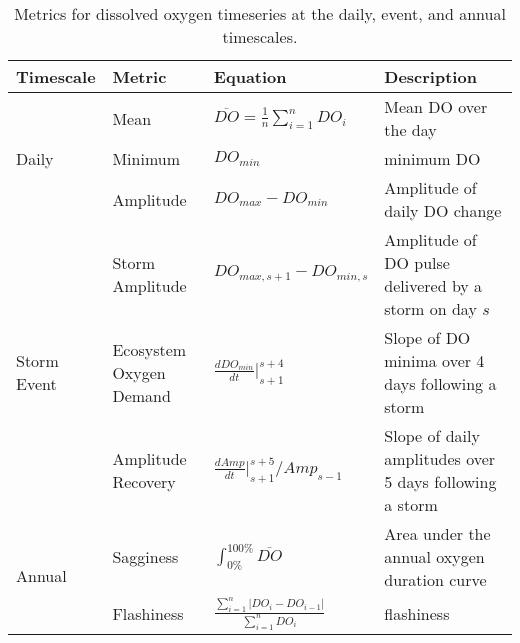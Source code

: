 \documentclass{article}
\begin{document}
\begin{table}[h!]
  \begin{center}
    \caption{Metrics for dissolved oxygen timeseries at the daily, event, and annual timescales.}
    \label{tab:table1}
    \begin{tabular}{p{.8in}|p{1in}|p{1.5in}|p{2in}} 
      \textbf{Timescale} & \textbf{Metric} & \textbf{Equation} & \textbf{Description}\\
      \hline
	\multirow{3}{*}{Daily} & Mean & $\overline{DO}=\frac{1}{n}\sum_{i=1}^{n} DO_{i}$ & Mean DO over the day\\ 
      & Minimum & $DO_{min}$ & minimum DO\\
	& Amplitude & $DO_{max}-DO_{min}$ & Amplitude of daily DO change\\
	\hline
      \multirow {3}{*}{Storm Event} & Storm \newline Amplitude & $DO_{max,s+1} - DO_{min,s}$ & Amplitude of DO pulse delivered by a storm on day $s$\\
      &Ecosystem Oxygen Demand & $\frac{dDO_{min}}{dt}|_{s+1}^{s+4}$ & Slope of DO minima over 4 days following a storm\\
	& Amplitude Recovery & $\frac{dAmp}{dt}|_{s+1}^{s+5}/Amp_{s-1}$ & Slope of daily amplitudes over 5 days following a storm\\
	\hline
	\multirow{2}{*}{Annual} & Sagginess & $\int_{0\%}^{100\%} \overline{DO}$ & Area under the annual oxygen duration curve\\
	& Flashiness & $\frac{\sum_{i=1}^{n} |DO_{i}-DO_{i-1}|}{\sum_{i=1}^{n} DO_{i}}$ & flashiness\\
    \end{tabular}
  \end{center}
\end{table}
\end{document}

